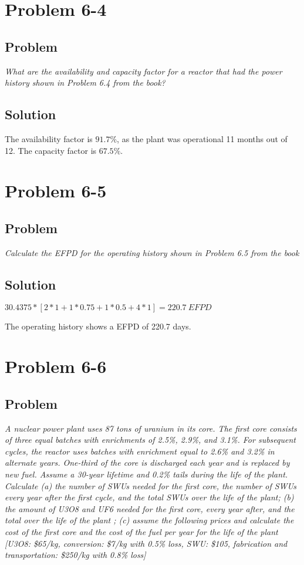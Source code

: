 \section{Problem 6-4}
\label{prob64}


\subsection{Problem}
\textit{What are the availability and capacity factor for a reactor that had the power history shown in Problem 6.4 from the book?}

\subsection{Solution}

The availability factor is $91.7\%$, as the plant was operational 11 months out of 12. The capacity factor is $67.5\%$.

\section{Problem 6-5}
\label{prob65}


\subsection{Problem}
\textit{Calculate the EFPD for the operating history shown in Problem 6.5 from the book}

\subsection{Solution}

$30.4375 * [2*1 + 1*0.75 + 1*0.5 + 4*1] = 220.7\ EFPD$

The operating history shows a EFPD of 220.7 days.


\section{Problem 6-6}
\label{prob66}


\subsection{Problem}
\textit{A nuclear power plant uses 87 tons of uranium in its core. The first core consists of three equal batches with enrichments of 2.5\%, 2.9\%, and 3.1\%. For subsequent cycles, the reactor uses batches with enrichment equal to 2.6\% and 3.2\% in alternate years. One-third of the core is discharged each year and is replaced by new fuel. Assume a 30-year lifetime and 0.2\% tails during the life of the plant. Calculate (a) the number of SWUs needed for the first core, the number of SWUs every year after the first cycle, and the total SWUs over the life of the plant; (b) the amount of U3O8 and UF6 needed for the first core, every year after, and the total over the life of the plant ; (c) assume the following prices and calculate the cost of the first core and the cost of the fuel per year for the life of the plant [U3O8: \$65/kg, conversion: \$7/kg with 0.5\% loss, SWU: \$105, fabrication and transportation: \$250/kg with 0.8\% loss]}

